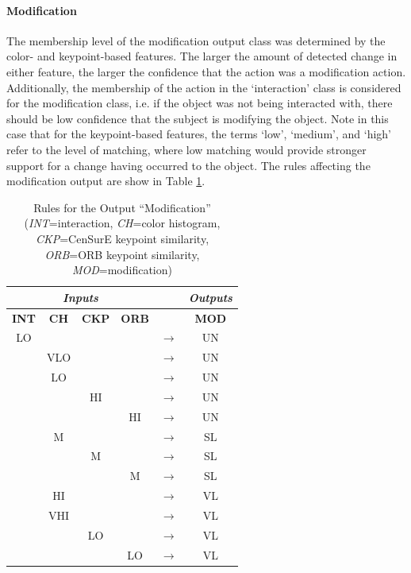 \documentclass[12pt]{report}
\begin{document}
\paragraph{Modification}
The membership level of the modification output class was determined by the color- and keypoint-based features. The larger the amount of detected change in either feature, the larger the confidence that the action was a modification action. Additionally, the membership of the action in the `interaction' class is considered for the modification class, i.e. if the object was not being interacted with, there should be low confidence that the subject is modifying the object. Note in this case that for the keypoint-based features, the terms `low', `medium', and `high' refer to the level of matching, where low matching would provide stronger support for a change having occurred to the object. The rules affecting the modification output are show in Table \ref{modifyRules}.

\begin{table}
\caption{Rules for the Output ``Modification'' (\textit{INT}=interaction, \textit{CH}=color histogram, \textit{CKP}=CenSurE keypoint similarity, \textit{ORB}=ORB keypoint similarity,  \textit{MOD}=modification)}
\begin{center}
\begin{tabular}{cccccc}
\hline
\multicolumn{4}{c}{\textbf{\textit{Inputs}}}& &\textbf{\textit{Outputs}} \\
\hline
\hline
\textbf{INT} & \textbf{CH} & \textbf{CKP} & \textbf{ORB} & & \textbf{MOD}\\
\hline
LO & & & & $\longrightarrow$ & UN \\
 & VLO & &  & $\longrightarrow$ & UN \\
 & LO & & & $\longrightarrow$ & UN \\
 & & HI & & $\longrightarrow$ & UN \\
 & & & HI & $\longrightarrow$ & UN \\
 & M & & & $\longrightarrow$ & SL \\
 & & M & & $\longrightarrow$ & SL \\
 & & & M & $\longrightarrow$ & SL \\
 & HI & & &  $\longrightarrow$ & VL \\
 & VHI & & & $\longrightarrow$ & VL \\
 & & LO & & $\longrightarrow$ & VL \\
 & & & LO & $\longrightarrow$ & VL \\
\hline
\end{tabular}
\label{modifyRules}
\end{center}
\end{table}
\end{document}
